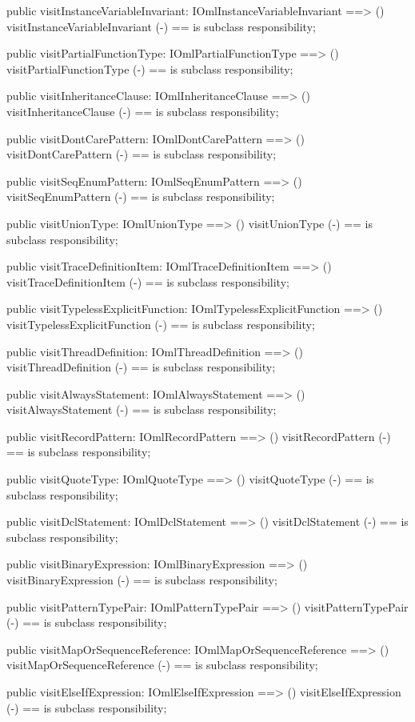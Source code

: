 \begin{vdm_al}
  public visitInstanceVariableInvariant: IOmlInstanceVariableInvariant ==> ()
  visitInstanceVariableInvariant (-) == is subclass responsibility;

  public visitPartialFunctionType: IOmlPartialFunctionType ==> ()
  visitPartialFunctionType (-) == is subclass responsibility;

  public visitInheritanceClause: IOmlInheritanceClause ==> ()
  visitInheritanceClause (-) == is subclass responsibility;

  public visitDontCarePattern: IOmlDontCarePattern ==> ()
  visitDontCarePattern (-) == is subclass responsibility;

  public visitSeqEnumPattern: IOmlSeqEnumPattern ==> ()
  visitSeqEnumPattern (-) == is subclass responsibility;

  public visitUnionType: IOmlUnionType ==> ()
  visitUnionType (-) == is subclass responsibility;

  public visitTraceDefinitionItem: IOmlTraceDefinitionItem ==> ()
  visitTraceDefinitionItem (-) == is subclass responsibility;

  public visitTypelessExplicitFunction: IOmlTypelessExplicitFunction ==> ()
  visitTypelessExplicitFunction (-) == is subclass responsibility;

  public visitThreadDefinition: IOmlThreadDefinition ==> ()
  visitThreadDefinition (-) == is subclass responsibility;

  public visitAlwaysStatement: IOmlAlwaysStatement ==> ()
  visitAlwaysStatement (-) == is subclass responsibility;

  public visitRecordPattern: IOmlRecordPattern ==> ()
  visitRecordPattern (-) == is subclass responsibility;

  public visitQuoteType: IOmlQuoteType ==> ()
  visitQuoteType (-) == is subclass responsibility;

  public visitDclStatement: IOmlDclStatement ==> ()
  visitDclStatement (-) == is subclass responsibility;

  public visitBinaryExpression: IOmlBinaryExpression ==> ()
  visitBinaryExpression (-) == is subclass responsibility;

  public visitPatternTypePair: IOmlPatternTypePair ==> ()
  visitPatternTypePair (-) == is subclass responsibility;

  public visitMapOrSequenceReference: IOmlMapOrSequenceReference ==> ()
  visitMapOrSequenceReference (-) == is subclass responsibility;

  public visitElseIfExpression: IOmlElseIfExpression ==> ()
  visitElseIfExpression (-) == is subclass responsibility;


\end{vdm_al}
